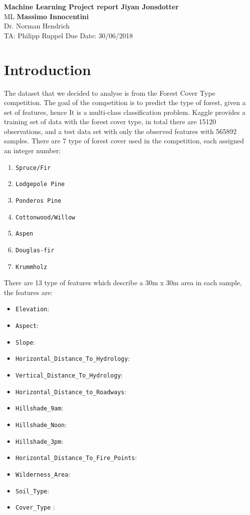 \documentclass[a4paper, 11pt]{article}
\begin{document}
\noindent
\large\textbf{Machine Learning Project report} \hfill \textbf{Jiyan Jonsdotter} \\
\normalsize ML \hfill \textbf{Massimo Innocentini} \\
Dr. Norman Hendrich \\
TA: Philipp Ruppel \hfill Due Date: 30/06/2018

\section*{Introduction}
The dataset that we decided to analyse is from the Forest Cover Type competition. The goal of the competition is to predict the type of forest, given a set of features, hence It is a multi-class classification problem. Kaggle provides a training set of data with the forest cover type, in total there are 15120 observations, and a test data set with only the observed features with 565892 samples. There are 7 type of forest cover used in the competition, each assigned an integer number: 

\begin{enumerate}
  \item \texttt{Spruce/Fir}
  \item \texttt{Lodgepole Pine}
  \item \texttt{Ponderos Pine}
  \item \texttt{Cottonwood/Willow}
  \item \texttt{Aspen}
  \item \texttt{Douglas-fir}
  \item \texttt{Krummholz}
\end{enumerate}

There are 13 type of features which describe a 30m x 30m area in each sample, the features are:

\begin{itemize}
  \item \texttt{Elevation}: 
  \item \texttt{Aspect}: 
  \item \texttt{Slope}: 
  \item \texttt{Horizontal\_Distance\_To\_Hydrology}: 
  \item \texttt{Vertical\_Distance\_To\_Hydrology}: 
  \item \texttt{Horizontal\_Distance\_to\_Roadways}: 
  \item \texttt{Hillshade\_9am}: 
  \item \texttt{Hillshade\_Noon}:
  \item \texttt{Hillshade\_3pm}:
  \item \texttt{Horizontal\_Distance\_To\_Fire\_Points}: 
  \item \texttt{Wilderness\_Area}: 
  \item \texttt{Soil\_Type}: 
  \item \texttt{Cover\_Type} :
\end{itemize} 
\end{document}
